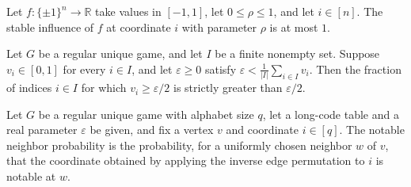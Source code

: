 \begin{theorem}
\label{FABL.RegularUniqueGame.boundedCubeFunction_stableInfluence_le_one}
\leanok
{}
Let $f:\{\pm1\}^n\to\mathbb R$ take values in $[-1,1]$, let $0\le\rho\le1$, and let
$i\in[n]$. The stable influence of $f$ at coordinate $i$ with parameter $\rho$ is at
most $1$.
\end{theorem}

\begin{theorem}
\label{FABL.RegularUniqueGame.half_lt_thresholdProbability_of_lt_expect}
\leanok
{}
Let $G$ be a regular unique game, and let $I$ be a finite nonempty set. Suppose
$v_i\in[0,1]$ for every $i\in I$, and let $\varepsilon\ge 0$ satisfy
$\varepsilon<\frac{1}{|I|}\sum_{i\in I}v_i$. Then the fraction of indices $i\in I$ for
which $v_i\ge\varepsilon/2$ is strictly greater than $\varepsilon/2$.
\end{theorem}

\begin{definition}
\label{FABL.RegularUniqueGame.notableNeighborProbability}
\leanok
{}
Let $G$ be a regular unique game with alphabet size $q$, let a long-code table and a
real parameter $\varepsilon$ be given, and fix a vertex $v$ and coordinate $i\in[q]$.
The notable neighbor probability is the probability, for a uniformly chosen neighbor $w$
of $v$, that the coordinate obtained by applying the inverse edge permutation to $i$ is
notable at $w$.
\end{definition}

